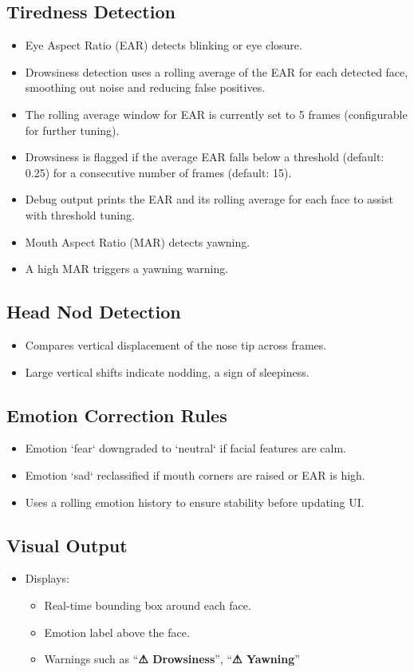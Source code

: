 \documentclass[12pt]{article}
\begin{document}
\subsection{Tiredness Detection}
\begin{itemize}
    \item Eye Aspect Ratio (EAR) detects blinking or eye closure.
    \item Drowsiness detection uses a rolling average of the EAR for each detected face, smoothing out noise and reducing false positives.
    \item The rolling average window for EAR is currently set to 5 frames (configurable for further tuning).
    \item Drowsiness is flagged if the average EAR falls below a threshold (default: 0.25) for a consecutive number of frames (default: 15).
    \item Debug output prints the EAR and its rolling average for each face to assist with threshold tuning.
    \item Mouth Aspect Ratio (MAR) detects yawning.
    \item A high MAR triggers a yawning warning.
\end{itemize}
\subsection{Head Nod Detection}
\begin{itemize}
    \item Compares vertical displacement of the nose tip across frames.
    \item Large vertical shifts indicate nodding, a sign of sleepiness.
\end{itemize}
\subsection{Emotion Correction Rules}
\begin{itemize}
    \item Emotion `fear` downgraded to `neutral` if facial features are calm.
    \item Emotion `sad` reclassified if mouth corners are raised or EAR is high.
    \item Uses a rolling emotion history to ensure stability before updating UI.
\end{itemize}
\subsection{Visual Output}
\begin{itemize}
    \item Displays:
    \begin{itemize}
        \item Real-time bounding box around each face.
        \item Emotion label above the face.
        \item Warnings such as ``\textbf{⚠ Drowsiness}'', ``\textbf{⚠ Yawning}''
    \end{itemize}
\end{itemize}
\end{document}
